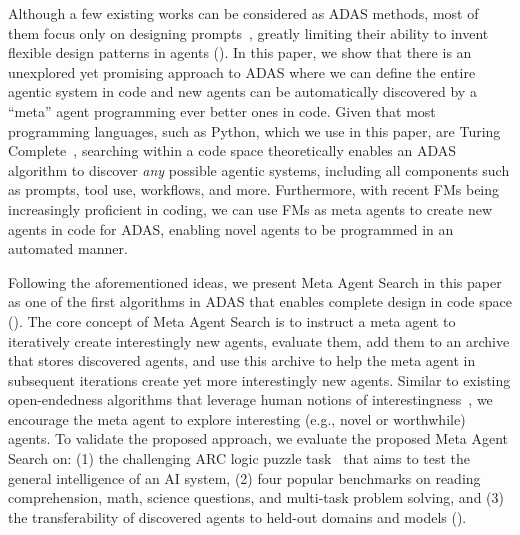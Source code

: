 \documentclass{article} %
\newcommand{\problem}{ADAS\xspace}
\newcommand{\ouralgo}{Meta Agent Search\xspace}
\begin{document}
Although a few existing works can be considered as \problem methods, most of them focus only on designing prompts~\citep{yang2024OPRO,fernando2024promptbreeder}, greatly limiting their ability to invent flexible design patterns in agents ().
In this paper, we show that there is an unexplored yet promising approach to \problem where we can define the entire agentic system in code and new agents can be automatically discovered by a ``meta'' agent programming ever better ones in code.
Given that most programming languages, such as Python, which we use in this paper, are Turing Complete~\citep{boyer1983mechanical,ladha2024turing}, searching within a code space theoretically enables an \problem algorithm to discover \emph{any} possible agentic systems, including all components such as prompts, tool use, workflows, and more.
Furthermore, with recent FMs being increasingly proficient in coding, we can use FMs as meta agents to create new agents in code for \problem, enabling novel agents to be programmed in an automated manner.

Following the aforementioned ideas, we present \ouralgo in this paper as one of the first algorithms in \problem that enables complete design in code space ().
The core concept of \ouralgo is to instruct a meta agent to iteratively create interestingly new agents, evaluate them, add them to an archive that stores discovered agents, and use this archive to help the meta agent in subsequent iterations create yet more interestingly new agents.
Similar to existing open-endedness algorithms that leverage human notions of interestingness~\citep{zhang2024omni,lu2024intelligent}, we encourage the meta agent to explore interesting (e.g., novel or worthwhile) agents.
To validate the proposed approach, we evaluate the proposed \ouralgo on: (1) the challenging ARC logic puzzle task~\citep{chollet2019measure} that aims to test the general intelligence of an AI system, (2) four popular benchmarks on reading comprehension, math, science questions, and multi-task problem solving, and (3) the transferability of discovered agents to held-out domains and models  (). 
\end{document}
